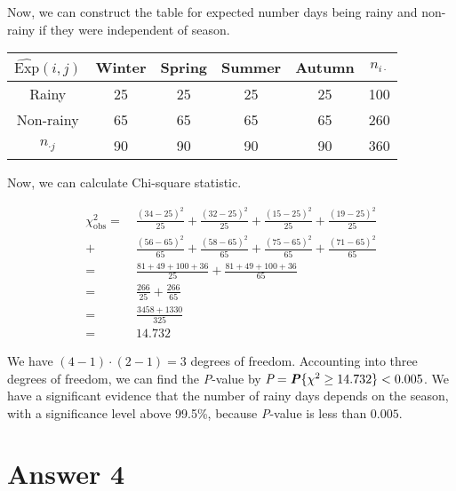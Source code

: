 \documentclass[12pt]{article}
\begin{document}
Now, we can construct the table for expected number days being rainy and
non-rainy if they were independent of season.

\begin{center}
\begin{tabular}{c|c c c c|c}
$\widehat{\text{Exp}}(i,j)$
              & Winter & Spring & Summer & Autumn & $n_{i \cdot}$ \\
\hline
Rainy         & 25 & 25 & 25 & 25 & 100 \\
Non-rainy     & 65 & 65 & 65 & 65 & 260 \\
\hline
$n_{\cdot j}$ & 90 & 90 & 90 & 90 & 360 \\
\end{tabular}
\end{center}

Now, we can calculate Chi-square statistic.

\begin{align*}
    \chi^2_\text{obs} =\ &\frac{(34-25)^2}{25} + \frac{(32-25)^2}{25}
                      +   \frac{(15-25)^2}{25} + \frac{(19-25)^2}{25} \\[0.75ex]
                      +\ &\frac{(56-65)^2}{65} + \frac{(58-65)^2}{65}
                      +   \frac{(75-65)^2}{65} + \frac{(71-65)^2}{65} \\[0.75ex]
    =\ &\frac{81+49+100+36}{25} + \frac{81+49+100+36}{65} \\[0.75ex]
    =\ &\frac{266}{25} + \frac{266}{65} \\[0.75ex]
    =\ &\frac{3458+1330}{325} \\[0.75ex]
    =\ &14.732
\end{align*}

We have $(4-1)\cdot(2-1) = 3$ degrees of freedom. Accounting into three degrees
of freedom, we can find the \textit{P}-value by $\textit{P} =
\textbf{\textit{P}}\{\chi^2 \geq 14.732\} < 0.005$. We have a significant
evidence that the number of rainy days depends on the season, with a
significance level above 99.5\%, because \textit{P}-value is less than $0.005$.

\section*{Answer 4}
\end{document}
